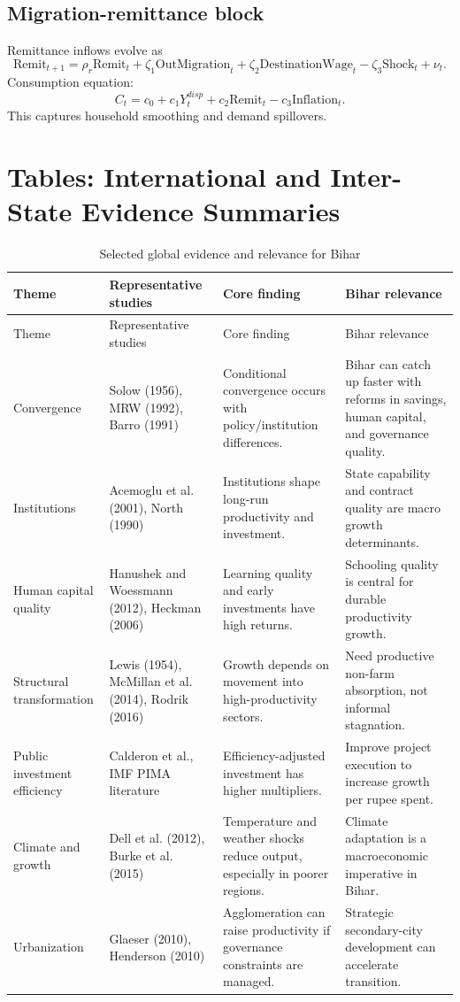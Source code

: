 \documentclass[preprint,12pt]{elsarticle}
\begin{document}
\subsection{Migration-remittance block}
Remittance inflows evolve as
\begin{equation}
\text{Remit}_{t+1}=\rho_r\text{Remit}_t + \zeta_1\text{OutMigration}_t + \zeta_2\text{DestinationWage}_t - \zeta_3\text{Shock}_t + \nu_t.
\end{equation}
Consumption equation:
\begin{equation}
C_t = c_0 + c_1 Y_t^{disp} + c_2 \text{Remit}_t - c_3 \text{Inflation}_t.
\end{equation}
This captures household smoothing and demand spillovers.

\section{Tables: International and Inter-State Evidence Summaries}
\begin{landscape}
\begin{longtable}{p{3cm}p{3.5cm}p{6cm}p{6cm}}
\caption{Selected global evidence and relevance for Bihar}\label{tab:global_evidence}\\
\toprule
Theme & Representative studies & Core finding & Bihar relevance \\
\midrule
\endfirsthead
\toprule
Theme & Representative studies & Core finding & Bihar relevance \\
\midrule
\endhead
Convergence & Solow (1956), MRW (1992), Barro (1991) & Conditional convergence occurs with policy/institution differences. & Bihar can catch up faster with reforms in savings, human capital, and governance quality. \\
Institutions & Acemoglu et al. (2001), North (1990) & Institutions shape long-run productivity and investment. & State capability and contract quality are macro growth determinants. \\
Human capital quality & Hanushek and Woessmann (2012), Heckman (2006) & Learning quality and early investments have high returns. & Schooling quality is central for durable productivity growth. \\
Structural transformation & Lewis (1954), McMillan et al. (2014), Rodrik (2016) & Growth depends on movement into high-productivity sectors. & Need productive non-farm absorption, not informal stagnation. \\
Public investment efficiency & Calderon et al., IMF PIMA literature & Efficiency-adjusted investment has higher multipliers. & Improve project execution to increase growth per rupee spent. \\
Climate and growth & Dell et al. (2012), Burke et al. (2015) & Temperature and weather shocks reduce output, especially in poorer regions. & Climate adaptation is a macroeconomic imperative in Bihar. \\
Urbanization & Glaeser (2010), Henderson (2010) & Agglomeration can raise productivity if governance constraints are managed. & Strategic secondary-city development can accelerate transition. \\
\bottomrule
\end{longtable}
\end{landscape}
\end{document}
